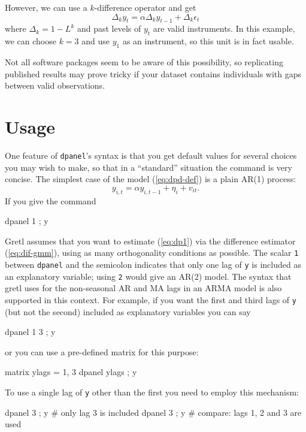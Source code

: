 However, we can use a $k$-difference operator and get
\[
\Delta_k y_t = \alpha \Delta_k y_{t-1} + \Delta_k \epsilon_t
\]
where $\Delta_k = 1 - L^k$ and past levels of $y_t$ are valid
instruments. In this example, we can choose $k=3$ and use $y_1$ as an
instrument, so this unit is in fact usable.

Not all software packages seem to be aware of this possibility, so
replicating published results may prove tricky if your dataset
contains individuals with gaps between valid observations.

\section{Usage}
\label{sec:dpanel-usage}

One feature of \texttt{dpanel}'s syntax is that you get default values
for several choices you may wish to make, so that in a ``standard''
situation the command is very concise.  The simplest case of the model
(\ref{eq:dpd-def}) is a plain AR(1) process:
\begin{equation}
\label{eq:dp1}
  y_{i,t} = \alpha y_{i,t-1} + \eta_{i} + v_{it} .
\end{equation}
If you give the command
\begin{code}
  dpanel 1 ; y
\end{code}
Gretl assumes that you want to estimate (\ref{eq:dp1}) via the
difference estimator (\ref{eq:dif-gmm}), using as many orthogonality
conditions as possible.  The scalar \texttt{1} between \texttt{dpanel}
and the semicolon indicates that only one lag of \texttt{y} is
included as an explanatory variable; using \texttt{2} would give an
AR(2) model. The syntax that gretl uses for the non-seasonal AR and MA
lags in an ARMA model is also supported in this context. For
example, if you want the first and third lags of \texttt{y} (but not
the second) included as explanatory variables you can say
\begin{code}
  dpanel {1 3} ; y
\end{code}
or you can use a pre-defined matrix for this purpose:
\begin{code}
  matrix ylags = {1, 3}
  dpanel ylags ; y
\end{code}
To use a single lag of \texttt{y} other than the first you need to
employ this mechanism:
\begin{code}
  dpanel {3} ; y # only lag 3 is included
  dpanel 3 ; y   # compare: lags 1, 2 and 3 are used
\end{code}

